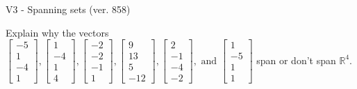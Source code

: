 \begin{exercise}
  \begin{exerciseTitle}V3 - Spanning sets (ver. 858)\end{exerciseTitle}
  \begin{exerciseStatement}
    Explain why the vectors \(\left[\begin{array}{r}
-5 \\
1 \\
-4 \\
1
\end{array}\right] , \left[\begin{array}{r}
1 \\
-4 \\
1 \\
4
\end{array}\right] , \left[\begin{array}{r}
-2 \\
-2 \\
-1 \\
1
\end{array}\right] , \left[\begin{array}{r}
9 \\
13 \\
5 \\
-12
\end{array}\right] , \left[\begin{array}{r}
2 \\
-1 \\
-4 \\
-2
\end{array}\right] , \text{ and } \left[\begin{array}{r}
1 \\
-5 \\
1 \\
1
\end{array}\right]\) span or don't span \(\mathbb{R}^4\). 
	



\end{exerciseStatement}
\end{exercise}
